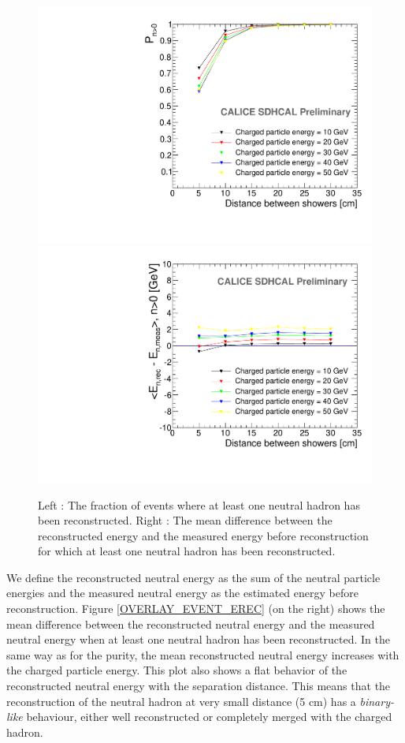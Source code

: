 \documentclass[cits]{JINST}
\begin{document}
\begin{figure}[!h]
  \begin{center}
    \includegraphics[width=0.47\linewidth]{plots/OverlayEvent_NeutralPercentage.pdf}
    \includegraphics[width=0.47\linewidth]{plots/OverlayEvent_NeutralEnergyDifferenceMeanNeutralEfficient.pdf}
  \end{center}
  \caption{\label{OVERLAY_EVENT_EREC} \label{OVERLAY_EVENT_NEUTRAL_PERCENTAGE} Left : The fraction of events where at least one neutral hadron has been reconstructed. Right : The mean difference between the reconstructed energy and the measured energy before reconstruction for which at least one neutral hadron has been reconstructed.}
\end{figure}

We define the reconstructed neutral energy as the sum of the neutral particle energies and the measured neutral energy as the estimated energy before reconstruction. Figure \ref{OVERLAY_EVENT_EREC} (on the right) shows the mean difference between the reconstructed neutral energy and the measured neutral energy when at least one neutral hadron has been reconstructed. In the same way as for the purity, the mean reconstructed neutral energy increases with the charged particle energy. This plot also shows a flat behavior of the reconstructed neutral energy with the separation distance. This means that the reconstruction of the neutral hadron at very small distance (5 cm) has a \textit{binary-like} behaviour, either well reconstructed or completely merged with the charged hadron.

\newpage
\end{document}
